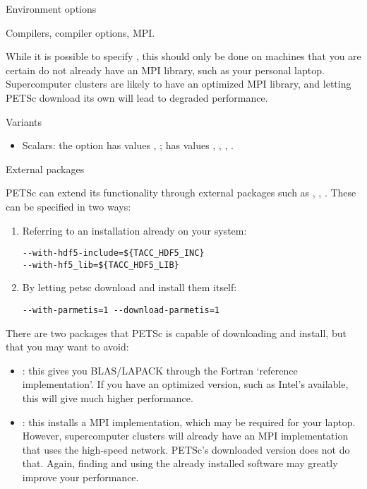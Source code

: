  {Environment options}

Compilers, compiler options, MPI.

While it is possible to specify ,
this should only be done on machines that you are certain do not
already have an MPI library, such as your personal
laptop. Supercomputer clusters are likely to have an optimized MPI
library, and letting PETSc download its own will lead to degraded
performance.

 {Variants}

\begin{itemize}
\item Scalars: the option  has values
  , ;  has values
  , , , .
\end{itemize}

 {External packages}
\label{sec:petsc-external}

PETSc can extend its functionality through external packages such as
, , . These can be
specified in two ways:
\begin{enumerate}
\item Referring to an installation already on your system:
\begin{verbatim}
--with-hdf5-include=${TACC_HDF5_INC}
--with-hf5_lib=${TACC_HDF5_LIB}
\end{verbatim}
\item By letting petsc download and install them itself:
\begin{verbatim}
--with-parmetis=1 --download-parmetis=1
\end{verbatim}
\end{enumerate}

\begin{remark}
  There are two packages that PETSc is capable of downloading and install,
  but that you may want to avoid:
  \begin{itemize}
  \item {}: this gives you BLAS/LAPACK through the
    Fortran `reference implementation'. If you have an optimized
    version, such as Intel's  available, this will give
    much higher performance.
  \item {}: this installs a MPI implementation, which may be
    required for your laptop. However, supercomputer clusters will
    already have an MPI implementation that uses the high-speed
    network. PETSc's downloaded version does not do that. Again,
    finding and using the already installed software may greatly
    improve your performance.
  \end{itemize}
\end{remark}
